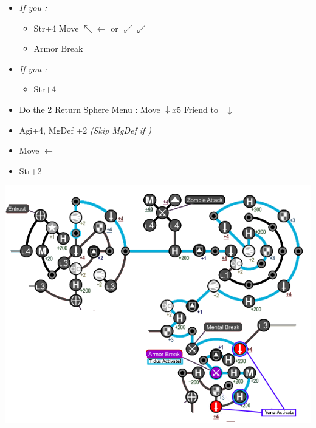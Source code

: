 \begin{spheregrid}
\begin{multicols}{2}
\begin{itemize}
\begin{itemize}
				      \begin{itemize}
					      \item \textit{If you \wonblitz:}
					            \begin{itemize}
						            \tidusf Move to Str+4 by Mental Break $\rightarrow x3, \downarrow, \rightarrow x3$
						            \yunaf Friend Sphere to \tidus
						            \item Str+4
						                  \tidusf Move $\nwarrow\leftarrow$ or $\swarrow\swarrow$
						            \item Armor Break
					            \end{itemize}
					      \item \textit{If you \lostblitz:}
					            \begin{itemize}
						            \tidusf Move to Armor Break $\rightarrow x3, \downarrow x6$
						            \tidusf Armor Break
						            \tidusf Move to HP $\searrow\searrow$
						            \yunaf Friend Sphere to \tidus
						            \item Str+4
					            \end{itemize}
					      \item Do the 2 Return Sphere Menu
					            \rikkuf: Move $\downarrow x5$
					            \yunaf Friend to \rikku\ $\downarrow$
					      \item Agi+4, MgDef +2 \textit{(Skip MgDef if \blitzloss)}
					      \item Move $\leftarrow$
					      \item Str+2
				      \end{itemize}
				      \includegraphics[width=.9\columnwidth]{graphics/post_BY_0_returns}

\end{itemize}
\end{itemize}
\end{multicols}
\end{spheregrid}
